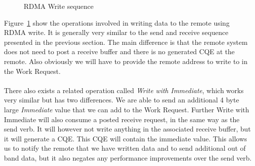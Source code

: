 \begin{figure}[!ht]
\begin{center}
\end{center}
\caption{RDMA Write sequence}
\label{fig:seq-wrt}
\end{figure}

Figure~\ref{fig:seq-wrt} show the operations involved in writing data to the remote using RDMA write. It is generally very
similar to the send and receive sequence presented in the previous section. The main difference is that the remote system does
not need to post a receive buffer and there is no generated CQE at the remote. Also obviously we will have to provide the 
remote address to write to in the Work Request.

\paragraph{} There also exists a related operation called \emph{Write with Immediate}, which works very similar but has two
differences. We are able to send an additional 4 byte large \emph{Immediate} value that we can add to the Work Request. 
Further Write with Immediate will also consume a posted receive request, in the same way as the send verb. It will however 
not write anything in the associated receive buffer, but it will generate a CQE. This CQE will contain the immediate value.
This allows us to notify the remote that we have written data and to send additional out of band data, but it also negates 
any performance improvements over the send verb.


